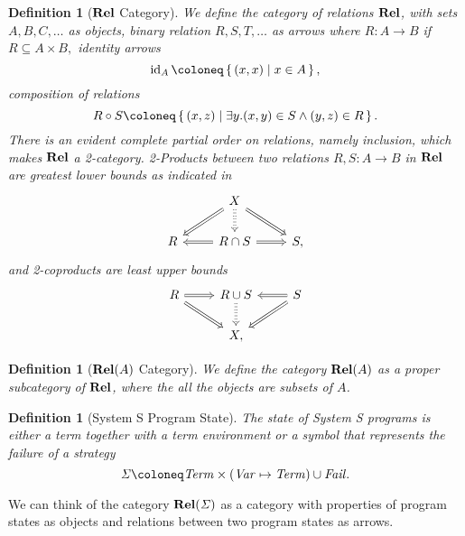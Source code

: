 \documentclass{article}
\newtheorem{definition}[theorem]{Definition}
\newcommand{\Term}{\ensuremath \mathit{Term}}
\newcommand{\Fail}{\ensuremath \mathit{Fail}}
\newcommand{\Var}{\ensuremath \mathit{Var}}
\newcommand{\Env}{\ensuremath \Var \mapsto \Term}
\newcommand{\Cat}[1]{\ensuremath \mathbf{#1}}
\newcommand{\State}{\ensuremath \mathit{\Sigma} }
\newcommand{\setbuild}[2]{\ensuremath \left\{\, #1 \mid #2 \,\right\}}
\newcommand{\id}{\ensuremath \operatorname{id}}
\newcommand{\Rel}{\ensuremath \Cat{Rel}}
\begin{document}
\begin{definition}[$\Rel$ Category] \normalfont
  We define the category of relations $\Rel$, with sets $A,B,C, \ldots$ as objects, binary relation $R,S,T, \ldots$ as arrows where $R: A \rightarrow B$ if $R \subseteq A \times B,$ identity arrows \[\id_A \coloneq \setbuild{ (x,x) }{ x \in A },\] composition of relations \[R \circ S \coloneq \setbuild{(x,z)}{ \exists y. (x,y) \in S \land (y,z) \in R }.\] There is an evident complete partial order on relations, namely inclusion, which makes $\Rel$ a 2-category. 2-Products between two relations $R,S:A \rightarrow B$ in $\Rel$ are greatest lower bounds as indicated in 
 \[
    \begin{tikzcd}
        & X \ar[dl,Rightarrow] \ar[d,Rightarrow,dotted] \ar[dr,Rightarrow] &   \\
      R & R \cap S \ar[l,Rightarrow] \ar[r,Rightarrow] & S,
    \end{tikzcd}
 \]
 and 2-coproducts are least upper bounds
 \[
    \begin{tikzcd}
      R\ar[dr,Rightarrow] \ar[r,Rightarrow]  & R \cup S \ar[d,Rightarrow,dotted] & S \ar[dl,Rightarrow] \ar[l,Rightarrow] \\
      & X, &
    \end{tikzcd}
 \]
\end{definition}

\begin{definition}[$\Rel(A)$ Category] \normalfont
  We define the category $\Rel(A)$ as a proper subcategory of $\Rel$, where the all the objects are subsets of $A$.
\end{definition}

\begin{definition}[System S Program State] \normalfont
  The state of System S programs is either a term together with a term environment or a symbol that represents the failure of a strategy \[\State \coloneq \Term \times (\Env) \cup \Fail.\]
\end{definition}

We can think of the category $\Rel(\State)$ as a category with properties of program states as objects and relations between two program states as arrows.
\end{document}
